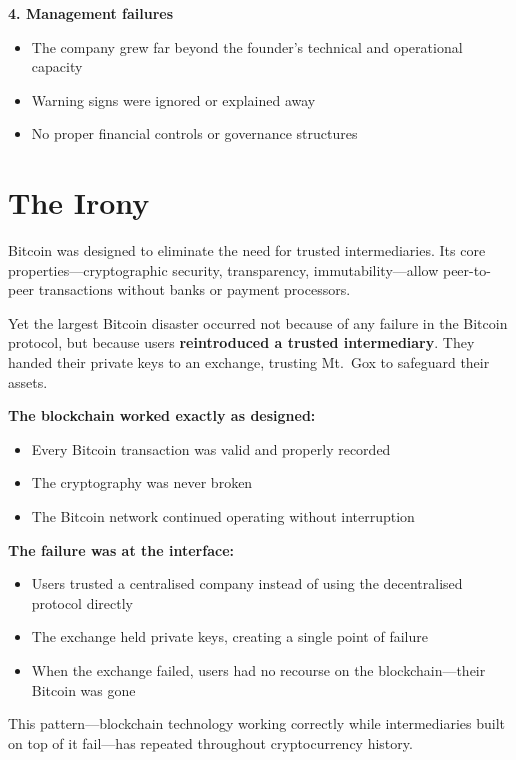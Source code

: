 \documentclass[11pt]{article}
\begin{document}
\medskip
\noindent\textbf{4. Management failures}
\begin{itemize}[leftmargin=*]
\item The company grew far beyond the founder's technical and operational capacity
\item Warning signs were ignored or explained away
\item No proper financial controls or governance structures
\end{itemize}

\section*{The Irony}

Bitcoin was designed to eliminate the need for trusted intermediaries. Its core properties---cryptographic security, transparency, immutability---allow peer-to-peer transactions without banks or payment processors.

Yet the largest Bitcoin disaster occurred not because of any failure in the Bitcoin protocol, but because users \textbf{reintroduced a trusted intermediary}. They handed their private keys to an exchange, trusting Mt.\ Gox to safeguard their assets.

\medskip
\noindent\textbf{The blockchain worked exactly as designed:}
\begin{itemize}[leftmargin=*]
\item Every Bitcoin transaction was valid and properly recorded
\item The cryptography was never broken
\item The Bitcoin network continued operating without interruption
\end{itemize}

\medskip
\noindent\textbf{The failure was at the interface:}
\begin{itemize}[leftmargin=*]
\item Users trusted a centralised company instead of using the decentralised protocol directly
\item The exchange held private keys, creating a single point of failure
\item When the exchange failed, users had no recourse on the blockchain---their Bitcoin was gone
\end{itemize}

This pattern---blockchain technology working correctly while intermediaries built on top of it fail---has repeated throughout cryptocurrency history.
\end{document}
